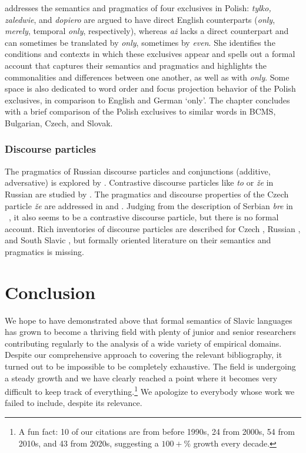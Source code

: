 \documentclass[output=paper,colorlinks,citecolor=brown]{langscibook}
\begin{document}
 addresses the semantics and pragmatics of four exclusives in Polish: \textit{tylko, zaledwie}, and \textit{dopiero} are argued to have direct English counterparts (\textit{only}, \textit{merely}, temporal \textit{only}, respectively), whereas \textit{aż} lacks a direct counterpart and can sometimes be translated by \textit{only}, sometimes by \textit{even}. She identifies the conditions and contexts in which these exclusives appear and spells out a formal account that captures their semantics and pragmatics and highlights the commonalities and differences between one another, as well as with \textit{only}. Some space is also dedicated to word order and focus projection behavior of the Polish exclusives, in comparison to English and German `only'. The chapter concludes with a brief comparison of the Polish exclusives to similar words in BCMS, Bulgarian, Czech, and Slovak. 

\subsubsection{Discourse particles} The pragmatics of Russian discourse particles and conjunctions (additive, adversative) is explored by \citet{Jasinskaja.Zeevat2008,jasinskaja-zeevat09,jasinskaja10}. Contrastive discourse particles like \textit{to} or \textit{že} in Russian are studied by \citet{mccoy01, hagstrommccoy, mccoy17}. The pragmatics and discourse properties of the Czech particle \textit{že} are addressed in \citet{gruetskrabalovaze} and \citet{kaspar17}. Judging from the description of Serbian \textit{bre} in \
\citet{miskovic}, it also seems to be a contrastive discourse particle, but there is no formal account. Rich inventories of %
discourse particles are described for Czech \citep{Nekula1996}, Russian \citep{zybatow}, and South Slavic \citep[][]{dedaic}, but formally oriented literature on their semantics and pragmatics is missing.

\section{Conclusion}

We hope to have demonstrated above that formal semantics of Slavic languages has grown to become a thriving field with plenty of junior and senior researchers contributing regularly to the analysis of a wide variety of empirical domains. Despite our comprehensive approach to covering the relevant bibliography, it turned out to be impossible to be completely exhaustive. The field is undergoing a steady growth and we have clearly reached a point where it becomes very difficult to keep track of everything.\footnote{A fun fact: 10 of our citations are from before 1990s, 24 from 2000s, 54 from 2010s, and 43 from 2020s, suggesting a $100+\%$ growth every decade.} We apologize to everybody whose work we failed to include, despite its relevance.
\end{document}
